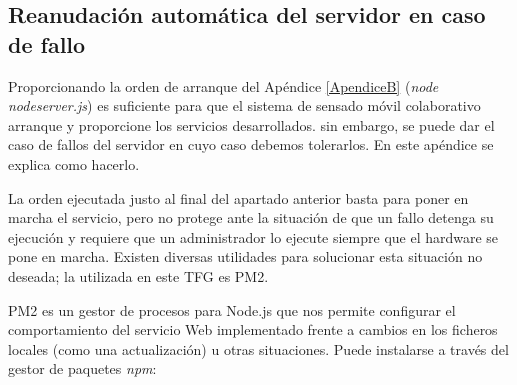 \begin{appendices}


\cleardoublepage
{}%
\begin{center}
\begin{minipage}{.75\textwidth}

\section{Reanudación automática del servidor en caso de fallo}\label{ApendiceC}

Proporcionando la orden de arranque del Apéndice \ref{ApendiceB} (\emph{node nodeserver.js}) es suficiente para que el sistema de sensado móvil colaborativo arranque y proporcione los servicios desarrollados. sin embargo, se puede dar el caso de fallos del servidor en cuyo caso debemos tolerarlos. En este apéndice se explica como hacerlo.
\end{minipage}
\end{center}
\clearpage%

La orden ejecutada justo al final del apartado anterior basta para poner en marcha el servicio, pero no protege ante la situación de que un fallo detenga su ejecución y requiere que un administrador lo ejecute siempre que el hardware se pone en marcha. Existen diversas utilidades para solucionar esta situación no deseada; la utilizada en este TFG es PM2.

PM2 es un gestor de procesos para Node.js que nos permite configurar el comportamiento del servicio Web implementado frente a cambios en los ficheros locales (como una actualización) u otras situaciones. Puede instalarse a través del gestor de paquetes \emph{npm}:



\end{appendices}
